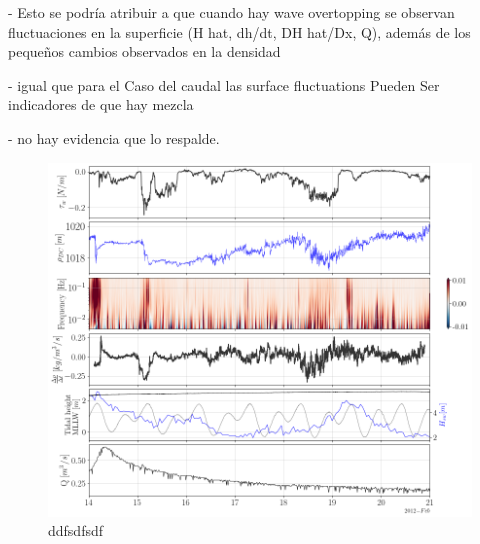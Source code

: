 \documentclass[tesis.tex]{subfiles}
\begin{document}
- Esto se podría atribuir a que cuando hay wave overtopping se observan fluctuaciones en la superficie (H hat, dh/dt, DH hat/Dx, Q), además de los pequeños cambios observados en la densidad

- igual que para el Caso del caudal las surface fluctuations Pueden Ser indicadores de que hay mezcla

- no hay evidencia que lo respalde.

\begin{figure}[h!]
    \centering
    \includegraphics[width=\textwidth]{Imagenes/mix_wo.png}
    \caption{ddfsdfsdf }
    \label{fig:mix_wo}
\end{figure}
\end{document}
